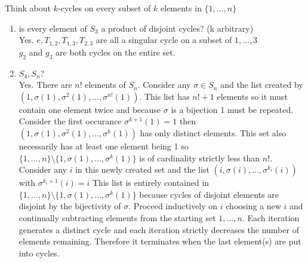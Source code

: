 \documentclass{article}
\begin{document}
    \section{}
    Think about $k$-cycles on every subset of $k$ elements in $\{1,...,n\}$ 
    \begin{enumerate}
        \item is every element of $S_3$ a product of disjoint cycles? (k arbitrary)\\
            Yes. 
            $e, T_{1,2}, T_{1,3}, T_{2,3}$ are all a singular cycle on a subset of ${1,...,3}$
            \\
            $g_2$ and $g_3$ are both cycles on the entire set.
        \item $S_4, S_n$?\\
            Yes.
            There are $n!$ elements of $S_n$. Consider any $\sigma \in S_n$ and the list created
        by $(1, \sigma(1), \sigma^2(1),...,\sigma^{n!}(1))$. This list has $n!+1$ elements
        so it must contain one element twice and because $\sigma $ is a bijection 1 must be repeated.
        Consider the first occurance $\sigma^{k+1}(1) = 1$ then $(1, \sigma(1), \sigma^2(1), ..., \sigma^k(1))$ has only distinct elements.
        This set also necessarily has at least one element being 1 so $\{1,...,n\} \setminus \{1, \sigma(1),...,\sigma^{k}(1)\}$ is of cardinality strictly
        less than $n!$. Consider any $i$ in this newly created set and the list $(i, \sigma(i), ..., \sigma^{k_i}(i))$ with $\sigma^{k_i+1}(i) = i$
        This list is entirely contained in $\{1,...,n\} \setminus \{1,\sigma(1),...,\sigma^{k}(1)\}$ because cycles of disjoint elements are disjoint by the bijectivity of $\sigma $.
        Proceed inductively on $i$ choosing a new $i$ and continually subtracting elements from the starting set $1,...,n$. Each iteration
        generates a distinct cycle and each iteration strictly decreases the number of elements remaining. Therefore it terminates when the last element(s) are put into cycles.
        

    \end{enumerate}

    
    
\end{document}

